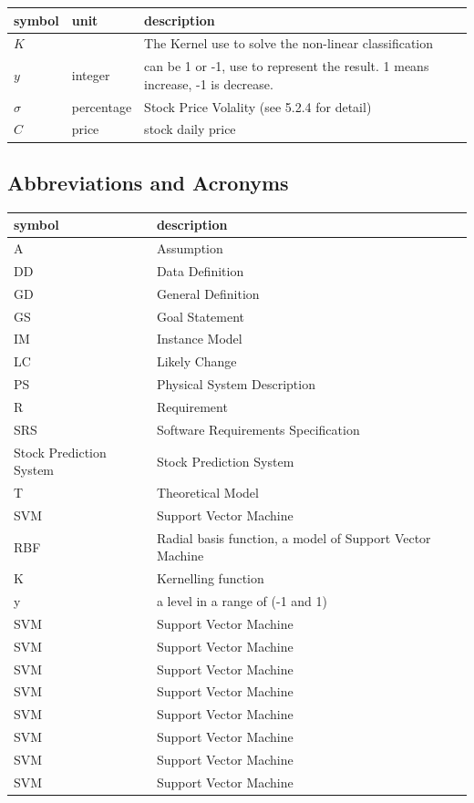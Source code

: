 \documentclass[12pt]{article}
\newcommand{\progname}{Stock Prediction System} %
\begin{document}
\renewcommand{\arraystretch}{1.2}
\noindent \begin{longtable*}{l l p{12cm}} \toprule
\textbf{symbol} & \textbf{unit} & \textbf{description}\\
\midrule 
$K$ & \si[per-mode=symbol] {} & The Kernel use to solve the non-linear classification\\
$y$ & \si[per-mode=symbol] {integer} & can be 1 or -1, use to represent the result. 1 means increase, -1 is decrease.\\
$\sigma$ & \si[per-mode=symbol] {percentage} & Stock Price Volality (see 5.2.4 for detail)\\ 
$C$ & \si[per-mode=symbol] {price} & stock daily price\\ 
\bottomrule
\end{longtable*}


\subsection{Abbreviations and Acronyms}

\renewcommand{\arraystretch}{1.2}
\begin{tabular}{l l} 
\toprule 
\textbf{symbol} & \textbf{description}\\
\midrule 
A & Assumption\\
DD & Data Definition\\
GD & General Definition\\
GS & Goal Statement\\
IM & Instance Model\\
LC & Likely Change\\
PS & Physical System Description\\
R & Requirement\\
SRS & Software Requirements Specification\\
\progname{} & {Stock Prediction System}\\
T & Theoretical Model\\
SVM & Support Vector Machine\\
RBF & Radial basis function, a model of Support Vector Machine\\
K & Kernelling function\\
y & a level in a range of (-1 and 1)\\
SVM & Support Vector Machine\\
SVM & Support Vector Machine\\
SVM & Support Vector Machine\\
SVM & Support Vector Machine\\
SVM & Support Vector Machine\\
SVM & Support Vector Machine\\
SVM & Support Vector Machine\\
SVM & Support Vector Machine\\
\bottomrule
\end{tabular}\\
\end{document}
